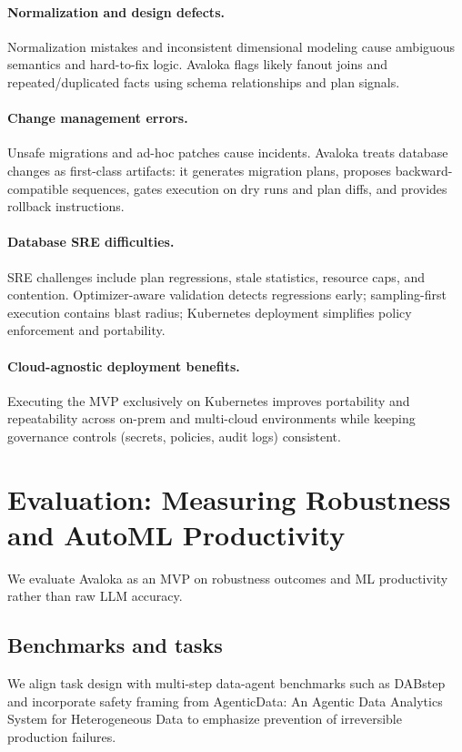 \documentclass{article} %
\begin{document}
\paragraph{Normalization and design defects.}
Normalization mistakes and inconsistent dimensional modeling cause ambiguous semantics and hard-to-fix logic.
Avaloka flags likely fanout joins and repeated/duplicated facts using schema relationships and plan signals.

\paragraph{Change management errors.}
Unsafe migrations and ad-hoc patches cause incidents. Avaloka treats database changes as first-class artifacts:
it generates migration plans, proposes backward-compatible sequences, gates execution on dry runs and plan diffs,
and provides rollback instructions.

\paragraph{Database SRE difficulties.}
SRE challenges include plan regressions, stale statistics, resource caps, and contention. Optimizer-aware
validation detects regressions early; sampling-first execution contains blast radius; Kubernetes deployment
simplifies policy enforcement and portability.

\paragraph{Cloud-agnostic deployment benefits.}
Executing the MVP exclusively on Kubernetes improves portability and repeatability across on-prem and multi-cloud
environments while keeping governance controls (secrets, policies, audit logs) consistent.

\section{Evaluation: Measuring Robustness and AutoML Productivity}
\label{sec:evaluation}
We evaluate Avaloka as an MVP on robustness outcomes and ML productivity rather than raw LLM accuracy.

\subsection{Benchmarks and tasks}
We align task design with multi-step data-agent benchmarks such as DABstep \citep{dabstep_adyen,dabstep_space}
and incorporate safety framing from AgenticData: An Agentic Data Analytics System for Heterogeneous Data\citep{agentswild2025,agentswild_site} to emphasize
prevention of irreversible production failures.
\end{document}
